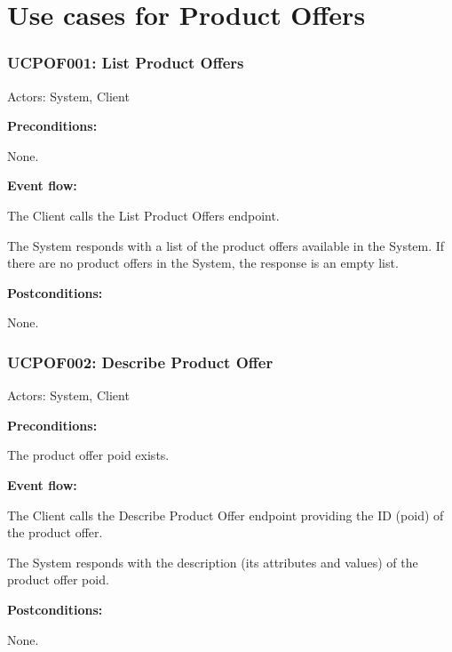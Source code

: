 \section{Use cases for Product Offers}

\begin{ucbox}{\subsubsection{UCPOF001: List Product Offers}}
\label{UCPOF001}

Actors: System, Client

\textbf{Preconditions:}

\ucitem None.

\textbf{Event flow:}

\ucitem The Client calls the List Product Offers endpoint.

\ucitem The System responds with a list of the product offers available in the System. If there are no product offers in the System, the response is an empty list.

\textbf{Postconditions:}

\ucitem None.

\end{ucbox}

\begin{ucbox}{\subsubsection{UCPOF002: Describe Product Offer}}
\label{UCPOF002}

Actors: System, Client

\textbf{Preconditions:} 

\ucitem The product offer poid exists.

\textbf{Event flow:}

\ucitem The Client calls the Describe Product Offer endpoint providing the ID (poid) of the product offer.

\ucitem The System responds with the description (its attributes and values) of the product offer poid.

\textbf{Postconditions:}

\ucitem None.

\end{ucbox}

